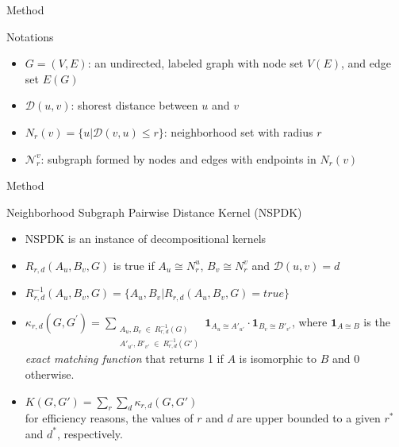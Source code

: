 \documentclass{beamer}
\begin{document}
\begin{frame}[t]{Method}
	\begin{block}{Notations}
		\begin{itemize}
			\item $G = (V, E)$: an undirected, labeled graph with node set $V(E)$, and edge set $E(G)$ \vspace{.5em}
			\item $\mathcal{D}(u,v)$: shorest distance between $u$ and $v$ \vspace{.5em}
			\item $N_r(v) = \lbrace u|\mathcal{D}(v,u)\leq r \rbrace$: neighborhood set with radius $r$ \vspace{.5em}
			\item $\mathcal{N}_r^v$: subgraph formed by nodes and edges with endpoints in $N_r(v)$
		\end{itemize}
	\end{block}
\end{frame}
\begin{frame}{Method}
	\begin{block}{Neighborhood Subgraph Pairwise Distance Kernel (NSPDK)}
\begin{itemize}
	\item NSPDK is an instance of decompositional kernels
	\item $R_{r,d}(A_u, B_v, G)$ is true if $A_u \cong N_r^u$, $B_v \cong N_r^v$ and $\mathcal{D}(u,v) = d$
	\item $R_{r,d}^{-1}(A_u, B_v, G) = \lbrace A_u, B_v | R_{r,d}(A_u, B_v, G) = true \rbrace$
	\item $\kappa_{r,d}(G,G^{'}) = 
\!\!\!\!\!\!\!\!\!\!\!\! 
\sum\limits_{\substack{A_u, B_v \ \in \ R_{r,d}^{-1}(G) \\ 
{A'}_{u'}, {B'}_{v'} \ \in \ R_{r,d}^{-1}(G')
}} \!\!\!\!\!\!\!\!\!\!\!\!  { { \textbf{1}_{A_{u} \cong A'_{u'}}} \cdot {
\textbf{1}_{B_{v} \cong B'_{v'}}} }$, where $\textbf{1}_{A \cong B}$ is the \textit{exact matching function} that returns 1 if $A$ is isomorphic to $B$ and 0 otherwise.
	\item $K(G,G') = \sum\limits_{r}{\sum\limits_{d}{\kappa_{r,d}(G,G')}}$ \\for efficiency reasons, the values of $r$ and $d$ are upper bounded to a given $r^*$ and $d^*$, respectively.
\end{itemize}		
	\end{block}
\end{frame}
\end{document}
